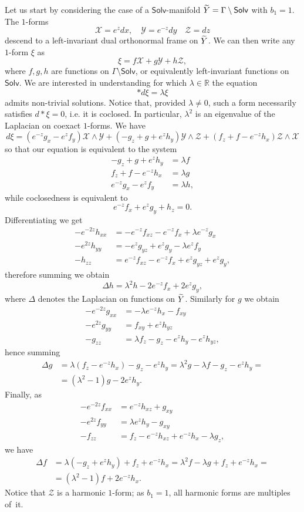 \documentclass[11pt]{article}
\theoremstyle{definition}
\numberwithin{equation}{section}
\numberwithin{figure}{section}
\numberwithin{table}{section}
\newcommand{\Solv}{\mathsf{Solv}}
\newcommand{\Y}{\mathcal{Y}}
\newcommand{\X}{\mathcal{X}}
\newcommand{\Z}{\mathcal{Z}}
\let\oldtilde\tilde
\renewcommand*{\tilde}[1]{\mathchoice{\widetilde{#1}}{\widetilde{#1}}{\oldtilde{#1}}{\oldtilde{#1}}}\let\oldhat\hat
\renewcommand*{\hat}[1]{\mathchoice{\widehat{#1}}{\widehat{#1}}{\oldhat{#1}}{\oldhat{#1}}}
\begin{document}
Let us start by considering the case of a $\Solv$-manifold $\tilde{Y}=\Gamma\setminus \Solv$ with $b_1=1$. The $1$-forms
\[
\X=e^zdx,\quad \Y=e^{-z}dy\quad \Z=dz
\]
descend to a left-invariant dual orthonormal frame on $\tilde{Y}$. We can then write any $1$-form $\xi$ as
\[
\xi=f\X+g\Y+h\Z,
\]
where $f,g,h$ are functions on $\Gamma\setminus\Solv$, or equivalently left-invariant functions on $\Solv$. We are interested in understanding for which $\lambda\in\mathbb{R}$ the equation
\[
\ast d\xi=\lambda\xi
\]
admits non-trivial solutions. Notice that, provided $\lambda\neq0$, such a form necessarily satisfies $d\ast\xi=0$, i.e. it is coclosed. In particular, $\lambda^2$ is an eigenvalue of the Laplacian on coexact $1$-forms. We have
\[
d\xi=\left(e^{-z}g_x-e^zf_y\right)\X\wedge \Y+
\left(-g_z+g+e^zh_y\right)\Y\wedge \Z+
\left(f_z+f-e^{-z}h_x\right)\Z\wedge \X
\]
so that our equation is equivalent to the system
\begin{equation}\label{eqn}
\begin{split}
-g_z+g+e^zh_y&=\lambda f\\
f_z+f-e^{-z}h_x&=\lambda g\\
e^{-z}g_x-e^zf_y&=\lambda h, 
\end{split}
\end{equation}
while coclosedness is equivalent to
\[
e^{-z}f_x+e^zg_y+h_z=0.
\]
Differentiating we get
\begin{align*}
-e^{-2z}h_{xx}&=-e^{-z}f_{xz}-e^{-z}f_x+\lambda e^{-z}g_x\\
-e^{2z}h_{yy}&=-e^{z}g_{yz}+e^z g_y-\lambda e^{z}f_y\\
-h_{zz}&=e^{-z}f_{xz}-e^{-z}f_x+e^zg_{yz}+e^zg_y,
\end{align*}
therefore summing we obtain
\[
\Delta h=\lambda^2 h-2e^{-z}f_x+2e^zg_y,
\]
where $\Delta$ denotes the Laplacian on functions on $\tilde{Y}$. Similarly for $g$ we obtain
\begin{align*}
-e^{-2z}g_{xx}&=-\lambda e^{-z} h_x-f_{xy}\\
-e^{2z}g_{yy}&=f_{xy}+e^zh_{yz}\\
-g_{zz}&=\lambda f_z-g_z-e^zh_y-e^zh_{yz},
\end{align*}
hence summing
\begin{align*}
\Delta g&=\lambda(f_z-e^{-z}h_x)-g_z-e^zh_y=\lambda^2g-\lambda f-g_z-e^zh_y=\\
&=\left(\lambda^2-1\right)g-2e^z h_y.
\end{align*}
Finally, as
\begin{align*}
-e^{-2z}f_{xx}&=e^{-z}h_{xz}+g_{xy}\\
-e^{2z}f_{yy}&=\lambda e^z h_y-g_{xy}\\
-f_{zz}&=f_z-e^{-z}h_{xz}+e^{-z}h_x-\lambda g_z,
\end{align*}
we have
\begin{align*}
\Delta f&=\lambda(-g_z+e^zh_y)+f_z+e^{-z}h_x=\lambda^2 f-\lambda g+f_z+e^{-z}h_x=\\
&=\left(\lambda^2-1\right)f+2e^{-z}h_x.
\end{align*}
Notice that $\Z$ is a harmonic $1$-form; as $b_1=1$, all harmonic forms are multiples of~it.
\end{document}
